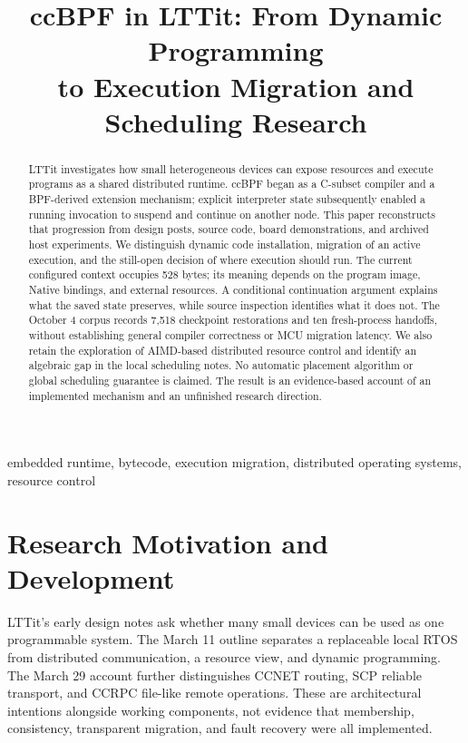 \documentclass[conference,letterpaper]{IEEEtran}
\title{ccBPF in LTTit: From Dynamic Programming\\to Execution Migration and Scheduling Research}
\author{\IEEEauthorblockN{Skai Uijing}\IEEEauthorblockA{LTTit Research\\Research record, October 6, 2026}}
\begin{document}
\maketitle
\begin{abstract}
LTTit investigates how small heterogeneous devices can expose resources and execute programs as a shared distributed runtime. ccBPF began as a C-subset compiler and a BPF-derived extension mechanism; explicit interpreter state subsequently enabled a running invocation to suspend and continue on another node. This paper reconstructs that progression from design posts, source code, board demonstrations, and archived host experiments. We distinguish dynamic code installation, migration of an active execution, and the still-open decision of where execution should run. The current configured context occupies 528 bytes; its meaning depends on the program image, Native bindings, and external resources. A conditional continuation argument explains what the saved state preserves, while source inspection identifies what it does not. The October 4 corpus records 7,518 checkpoint restorations and ten fresh-process handoffs, without establishing general compiler correctness or MCU migration latency. We also retain the exploration of AIMD-based distributed resource control and identify an algebraic gap in the local scheduling notes. No automatic placement algorithm or global scheduling guarantee is claimed. The result is an evidence-based account of an implemented mechanism and an unfinished research direction.
\end{abstract}
\begin{IEEEkeywords}
embedded runtime, bytecode, execution migration, distributed operating systems, resource control
\end{IEEEkeywords}

\section{Research Motivation and Development}
LTTit's early design notes ask whether many small devices can be used as one programmable system. The March 11 outline separates a replaceable local RTOS from distributed communication, a resource view, and dynamic programming. The March 29 account further distinguishes CCNET routing, SCP reliable transport, and CCRPC file-like remote operations. These are architectural intentions alongside working components, not evidence that membership, consistency, transparent migration, and fault recovery were all implemented.
\end{document}
